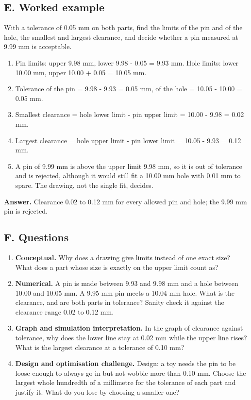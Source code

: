 \documentclass[11pt,a4paper]{article}
\begin{document}
\subsection*{E. Worked example}
With a tolerance of 0.05 mm on both parts, find the limits of the pin and of the hole, the smallest and largest clearance, and decide whether a pin measured at 9.99 mm is acceptable.
\begin{enumerate}[nosep]
\item Pin limits: upper 9.98 mm, lower 9.98 - 0.05 = 9.93 mm. Hole limits: lower 10.00 mm, upper 10.00 + 0.05 = 10.05 mm.
\item Tolerance of the pin = 9.98 - 9.93 = 0.05 mm, of the hole = 10.05 - 10.00 = 0.05 mm.
\item Smallest clearance = hole lower limit - pin upper limit = 10.00 - 9.98 = 0.02 mm.
\item Largest clearance = hole upper limit - pin lower limit = 10.05 - 9.93 = 0.12 mm.
\item A pin of 9.99 mm is above the upper limit 9.98 mm, so it is out of tolerance and is rejected, although it would still fit a 10.00 mm hole with 0.01 mm to spare. The drawing, not the single fit, decides.
\end{enumerate}
\textbf{Answer.} Clearance 0.02 to 0.12 mm for every allowed pin and hole; the 9.99 mm pin is rejected.

\subsection*{F. Questions}
\begin{enumerate}[nosep]
\item \textbf{Conceptual.} Why does a drawing give limits instead of one exact size? What does a part whose size is exactly on the upper limit count as?
\item \textbf{Numerical.} A pin is made between 9.93 and 9.98 mm and a hole between 10.00 and 10.05 mm. A 9.95 mm pin meets a 10.04 mm hole. What is the clearance, and are both parts in tolerance? Sanity check it against the clearance range 0.02 to 0.12 mm.
\item \textbf{Graph and simulation interpretation.} In the graph of clearance against tolerance, why does the lower line stay at 0.02 mm while the upper line rises? What is the largest clearance at a tolerance of 0.10 mm?
\item \textbf{Design and optimisation challenge.} Design: a toy needs the pin to be loose enough to always go in but not wobble more than 0.10 mm. Choose the largest whole hundredth of a millimetre for the tolerance of each part and justify it. What do you lose by choosing a smaller one?
\end{enumerate}
\end{document}
